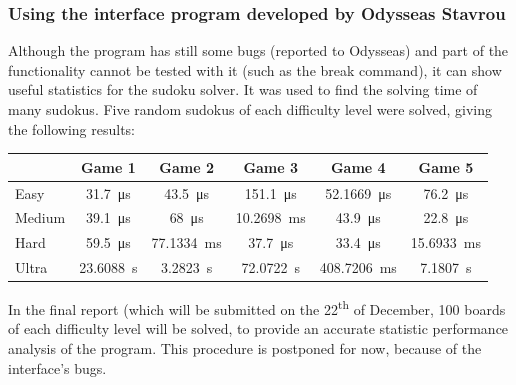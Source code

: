 \documentclass[12pt, a4, hidelinks]{article}
\begin{document}
\subsubsection*{Using the interface program developed by Odysseas Stavrou}
Although the program has still some bugs (reported to Odysseas) and part of the functionality cannot be tested with it (such as the break command), it can show useful statistics for the sudoku solver. It was used to find the solving time of many sudokus. Five random sudokus of each difficulty level were solved, giving the following results:
\begin{center}
\begin{tabular}{ |l|c|c|c|c|c| } 
 \hline
              & Game 1  & Game 2 & Game 3 & Game 4 & Game 5 \\  \hline
 Easy      &  \SI{31.7}{\micro\second}  &   \SI{43.5}{\micro\second}   & \SI{151.1}{\micro\second}  &\SI{52.1669}{\micro\second}     &\SI{76.2}{\micro\second} \\  \hline
 Medium &   \SI{39.1}{\micro\second}  &   \SI{68}{\micro\second}   & \SI{10.2698}{\milli\second}    & \SI{43.9}{\micro\second}  &\SI{22.8}{\micro\second}  \\  \hline
 Hard     &   \SI{59.5}{\micro\second}    &    \SI{77.1334}{\milli\second}  & \SI{37.7}{\micro\second}   & \SI{33.4}{\micro\second}  & \SI{15.6933}{\milli\second}    \\  \hline
 Ultra     &  \SI{23.6088}{\second}   &    \SI{3.2823}{\second}   & \SI{72.0722}{\second}  & \SI{408.7206}{\milli\second}   & \SI{7.1807}{\second}    \\  \hline
\end{tabular}
\end{center}
In the final report (which will be submitted on the 22\textsuperscript{th} of December, 100 boards of each difficulty level will be solved, to provide an accurate statistic performance analysis of the program. This procedure is postponed for now, because of the interface's bugs.
\end{document}

